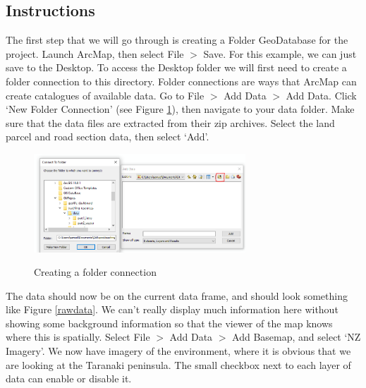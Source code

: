 \documentclass{article}
\begin{document}
\subsection{Instructions}
The first step that we will go through is creating a Folder GeoDatabase for the project. Launch ArcMap, then select File $>$ Save. For this example, we can just save to the Desktop. To access the Desktop folder we will first need to create a folder connection to this directory. Folder connections are ways that ArcMap can create catalogues of available data. Go to File $>$ Add Data $>$ Add Data. Click `New Folder Connection' (see Figure \ref{folderconnection}), then navigate to your data folder. Make sure that the data files are extracted from their zip archives. Select the land parcel and road section data, then select `Add'. \\

\begin{figure}[h]
  \centering
  \caption{Creating a folder connection}
  \includegraphics[width=300px]{images/part1/folderconnection.PNG}
  \label{folderconnection}
\end{figure}

The data should now be on the current data frame, and should look something like Figure \ref{rawdata}. We can't really display much information here without showing some background information so that the viewer of the map knows where this is spatially. Select File $>$ Add Data $>$ Add Basemap, and select `NZ Imagery'. We now have imagery of the environment, where it is obvious that we are looking at the Taranaki peninsula. The small checkbox next to each layer of data can enable or disable it.\\
\end{document}

